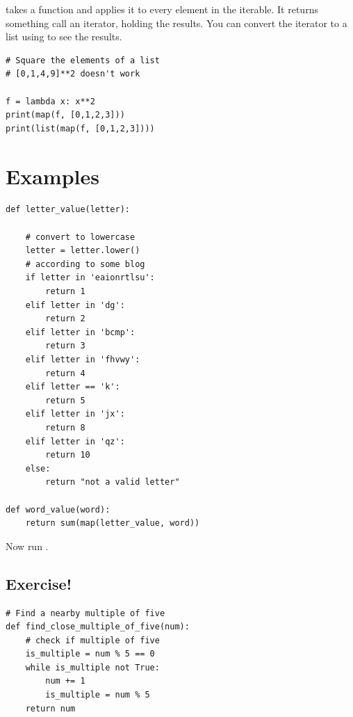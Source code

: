  takes a function and applies it to every element in the iterable. It returns something call an iterator, holding the results. You can convert the iterator to a list using  to see the results. 

\begin{lstlisting}
# Square the elements of a list
# [0,1,4,9]**2 doesn't work

f = lambda x: x**2
print(map(f, [0,1,2,3]))
print(list(map(f, [0,1,2,3])))
\end{lstlisting}

\section{Examples}

\begin{lstlisting}
def letter_value(letter):
    
    # convert to lowercase
    letter = letter.lower() 
    # according to some blog
    if letter in 'eaionrtlsu':
        return 1
    elif letter in 'dg':
        return 2
    elif letter in 'bcmp':
        return 3
    elif letter in 'fhvwy':
        return 4
    elif letter == 'k':
        return 5
    elif letter in 'jx':
        return 8
    elif letter in 'qz':
        return 10
    else:
        return "not a valid letter"
    
def word_value(word):
    return sum(map(letter_value, word))
\end{lstlisting}

Now run .

 
 
 \subsection{Exercise!}
 \begin{lstlisting}
# Find a nearby multiple of five
def find_close_multiple_of_five(num):
    # check if multiple of five
    is_multiple = num % 5 == 0
    while is_multiple not True:
        num += 1
        is_multiple = num % 5
    return num \end{lstlisting}
    
    
